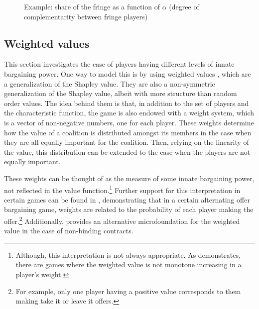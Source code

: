 \documentclass[a4paper]{article}
\begin{document}
\begin{figure}
    \centering
    \caption{Example: share of the fringe as a function of $\alpha$ (degree of complementarity between fringe players)}
    \label{fig:power_function_example}
\end{figure}


\subsection{Weighted values}
\label{sec:weighted_one_sided}

This section investigates the case of players having different levels of innate bargaining power.
One way to model this is by using weighted values \parencite{shapley1953additive}, which are a generalization of the Shapley value.
They are also a non-symmetric generalization of the Shapley value, albeit with more structure than random order values.
The idea behind them is that, in addition to the set of players and the characteristic function, the game is also endowed with a weight system, which is a vector of non-negative numbers, one for each player.
These weights determine how the value of a coalition is distributed amongst its members in the case when they are all equally important for the coalition.
Then, relying on the linearity of the value, this distribution can be extended to the case when the players are not equally important.

These weights can be thought of as the measure of some innate bargaining power, not reflected in the value function.\footnote{
    Although, this interpretation is not always appropriate.
    As \textcite{owen1968communications} demonstrates, there are games where the weighted value is not monotone increasing in a player's weight.
}
Further support for this interpretation in certain games can be found in \textcite{hart1996bargaining}, demonstrating that in a certain alternating offer bargaining game, weights are related to the probability of each player making the offer.\footnote{
    For example, only one player having a positive value corresponds to them making take it or leave it offers.
}
Additionally, \textcite{stole1996intra} provides an alternative microfoundation for the weighted value in the case of non-binding contracts.
\end{document}
